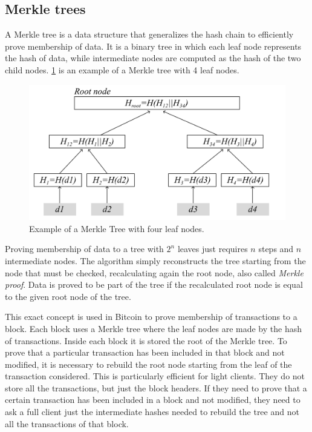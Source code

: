 \subsection{Merkle trees}

A Merkle tree is a data structure that generalizes the hash chain to efficiently prove membership of data. It is a binary tree in which each leaf node represents the hash of data, while intermediate nodes are computed as the hash of the two child nodes. \cref{fig:merkle-tree} is an example of a Merkle tree with 4 leaf nodes.

\begin{figure}[H]
  \centering
  \includegraphics[width=1\textwidth]{Figures/background/merkle_tree.jpg}
  \caption[]{Example of a Merkle Tree with four leaf nodes.}
  \label{fig:merkle-tree}
\end{figure}

Proving membership of data to a tree with $2^n$ leaves just requires $n$ steps and $n$ intermediate nodes. The algorithm simply reconstructs the tree starting from the node that must be checked, recalculating again the root node, also called \textit{Merkle proof}. Data is proved to be part of the tree if the recalculated root node is equal to the given root node of the tree.

This exact concept is used in Bitcoin to prove membership of transactions to a block. Each block uses a Merkle tree where the leaf nodes are made by the hash of transactions. Inside each block it is stored the root of the Merkle tree. To prove that a particular transaction has been included in that block and not modified, it is necessary to rebuild the root node starting from the leaf of the transaction considered. This is particularly efficient for light clients. They do not store all the transactions, but just the block headers. If they need to prove that a certain transaction has been included in a block and not modified, they need to ask a full client just the intermediate hashes needed to rebuild the tree and not all the transactions of that block.

